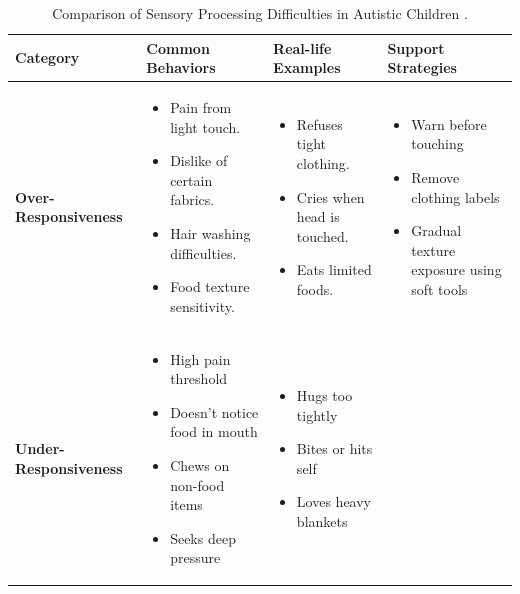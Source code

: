 \documentclass[a4paper,12pt]{report}
\begin{document}
\begin{table}[h]
\centering
\caption[Comparison Of Sensory Processing Difficulties In Autistic Children]{Comparison of Sensory Processing Difficulties in Autistic Children \cite{autismorg_uk_sensory_differences}.}

\renewcommand{\arraystretch}{1.2} %
\begin{tabular}{|p{3.2cm}|p{4.5cm}|p{4cm}|p{4.2cm}|}
\hline
\textbf{Category} & \textbf{Common Behaviors} & \textbf{Real-life Examples} & \textbf{Support Strategies} \\
\hline
\textbf{Over-Responsiveness} &
\begin{itemize}[leftmargin=*, nosep]
  \item Pain from light touch.
  \item Dislike of certain fabrics.
  \item Hair washing difficulties.
  \item Food texture sensitivity.
\end{itemize} &
\begin{itemize}[leftmargin=*, nosep]
  \item Refuses tight clothing.
  \item Cries when head is touched.
  \item Eats limited foods.
\end{itemize} &
\begin{itemize}[leftmargin=*, nosep]
  \item Warn before touching
  \item Remove clothing labels
  \item Gradual texture exposure using soft tools
\end{itemize} \\
\hline
\textbf{Under-Responsiveness} &
\begin{itemize}[leftmargin=*, nosep]
  \item High pain threshold
  \item Doesn’t notice food in mouth
  \item Chews on non-food items
  \item Seeks deep pressure
\end{itemize} &
\begin{itemize}[leftmargin=*, nosep]
  \item Hugs too tightly
  \item Bites or hits self
  \item Loves heavy blankets
\end{itemize} &

\end{tabular}
\end{table}
\end{document}
